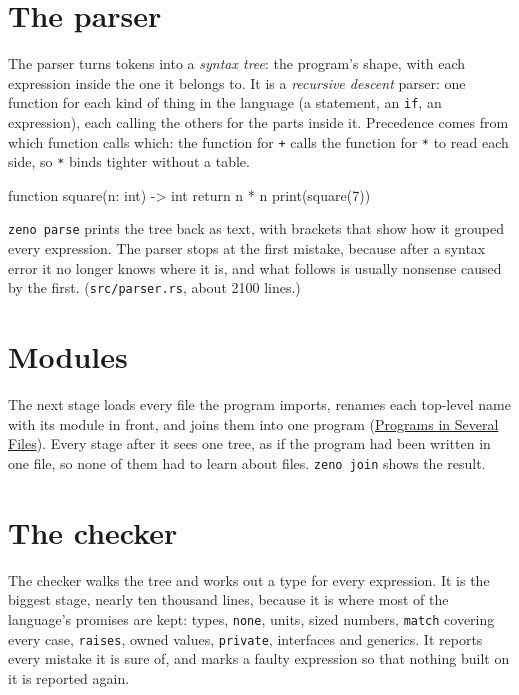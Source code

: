 \section{The parser}

The parser turns tokens into a \emph{syntax tree}: the program's shape,
with each expression inside the one it belongs to. It is a
\emph{recursive descent} parser: one function for each kind of thing in
the language (a statement, an \verb|if|, an expression), each calling
the others for the parts inside it. Precedence comes from which
function calls which: the function for \verb|+| calls the function for
\verb|*| to read each side, so \verb|*| binds tighter without a table.

\begin{zeno}[file=square.zeno, dir=sq, show=no, cmd=zeno parse {file}]
function square(n: int) -> int {
    return n * n
}
print(square(7))
\end{zeno}

\verb|zeno parse| prints the tree back as text, with brackets that show
how it grouped every expression. The parser stops at the first mistake,
because after a syntax error it no longer knows where it is, and what
follows is usually nonsense caused by the first. (\verb|src/parser.rs|,
about 2100 lines.)

\section{Modules}

The next stage loads every file the program imports, renames each
top-level name with its module in front, and joins them into one
program (\hyperref[ch-modules]{Programs in Several Files}). Every stage
after it sees one tree, as if the program had been written in one
file, so none of them had to learn about files. \verb|zeno join| shows
the result.

\section{The checker}

The checker walks the tree and works out a type for every expression.
It is the biggest stage, nearly ten thousand lines, because it is where
most of the language's promises are kept: types, \verb|none|, units,
sized numbers, \verb|match| covering every case, \verb|raises|, owned
values, \verb|private|, interfaces and generics. It reports every
mistake it is sure of, and marks a faulty expression so that nothing
built on it is reported again.

